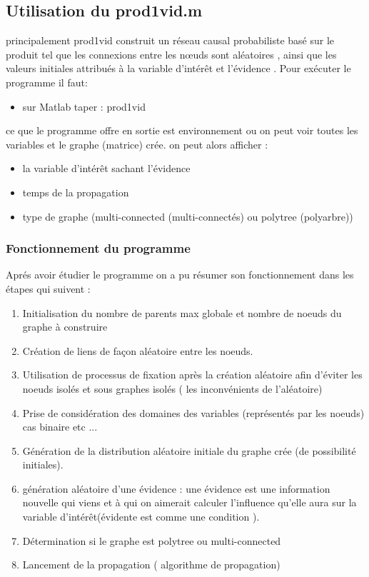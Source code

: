 \documentclass[12pt,a4paper,oneside]{book}
\begin{document}
	\subsection{Utilisation du prod1vid.m}
	 principalement prod1vid construit un réseau causal probabiliste basé sur le produit tel que les connexions entre les nœuds sont aléatoires , ainsi que les valeurs initiales attribués à la variable d'intérêt et l'évidence .
	 Pour exécuter le programme il faut:
	 \begin{itemize}
	 	\item sur Matlab taper : prod1vid
	 	
	 \end{itemize}
	 ce que le programme offre en sortie est environnement ou on peut voir toutes les variables et le graphe (matrice) crée.
	 on peut alors afficher :
	 
	 \begin{itemize}
	 	\item la variable d'intérêt sachant l'évidence
	 	\item temps de la propagation
	 	\item type de graphe (multi-connected (multi-connectés) ou polytree (polyarbre))
	 \end{itemize}
	 \subsubsection{Fonctionnement du programme}
	 Aprés avoir étudier le programme on a pu résumer son fonctionnement dans les étapes qui suivent :
	 \begin{enumerate}
	 	\item Initialisation du nombre de parents max globale et nombre de noeuds du graphe à construire
	 	\item Création de liens de façon aléatoire entre les noeuds.
	 	\item Utilisation de processus de fixation après la création aléatoire afin d'éviter les noeuds isolés et sous graphes isolés ( les inconvénients de l'aléatoire)
	 	\item Prise de considération des domaines des variables (représentés par les noeuds)
	 	cas binaire etc ...
	 	\item Génération de la distribution aléatoire initiale du graphe crée (de possibilité initiales).
	 	\item génération aléatoire d'une évidence  : une évidence est une information nouvelle qui viens et à qui on aimerait calculer l'influence qu'elle aura sur la variable d'intérêt(évidente est comme une condition ).
	 	\item Détermination si le graphe est polytree ou multi-connected
	 	\item Lancement de la propagation ( algorithme de propagation)
	 	
	 	
	 \end{enumerate}
	 
\end{document}
